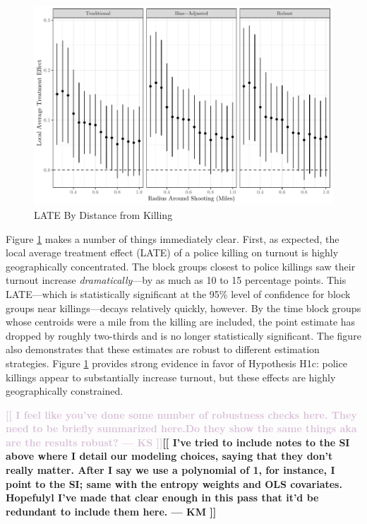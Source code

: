 \documentclass[12pt]{article}
\newcommand{\kscomment}[1]{\textbf{\textcolor{Thistle}{[[ #1 --- KS ]]}}}
\newcommand{\kmcomment}[1]{\textbf{\textcolor{JungleGreen}{[[ #1 --- KM ]]}}}
\begin{document}
\begin{figure}[!t]

{\centering \includegraphics[width=0.9\linewidth]{Figures/dists-1} 

}

\caption{\label{fig:diff-dist}LATE By Distance from Killing}
\end{figure}

Figure \ref{fig:diff-dist} makes a number of things immediately clear. First, as expected, the local average treatment effect (LATE) of a police killing on turnout is highly geographically concentrated. The block groups closest to police killings saw their turnout increase \textit{dramatically}---by as much as 10 to 15 percentage points. This LATE---which is statistically significant at the 95\% level of confidence for block groups near killings---decays relatively quickly, however. By the time block groups whose centroids were a mile from the killing are included, the point estimate has dropped by roughly two-thirds and is no longer statistically significant. The figure also demonstrates that these estimates are robust to different estimation strategies. Figure \ref{fig:diff-dist} provides strong evidence in favor of Hypothesis H1c: police killings appear to substantially increase turnout, but these effects are highly geographically constrained.

\kscomment{I feel like you've done some number of robustness checks here. They need to be briefly summarized here.Do they show the same things aka are the results robust?}\kmcomment{I've tried to include notes to the SI above where I detail our modeling choices, saying that they don't really matter. After I say we use a polynomial of 1, for instance, I point to the SI; same with the entropy weights and OLS covariates. Hopefulyl I've made that clear enough in this pass that it'd be redundant to include them here.}
\end{document}
